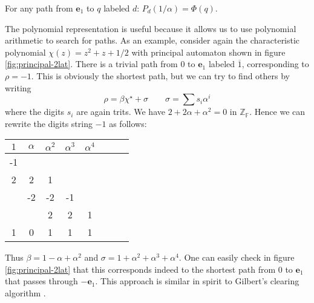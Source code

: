 \documentclass[12pt]{svmult}
\def\FF{\mathbb{F}}
\def\II{\Z_{\FF}}
\def\Z{\mathbb{Z}}
\def\chis{\Star{\chi}}          %
\def\ppol#1#2{P^{#1}_{#2}}      %
\def\trtm{\overline{1}}
\def\unvo{\mathbf{e}_{1}}
\providecommand{\Star}[1]{{#1}^{\star}}
\begin{document}
\begin{lemma}
\label{lem:path-poly-label}
For any path from $\unvo$ to $q$ labeled $d$: $\ppol{}{d}(1/\alpha) = \Phi(q)$.
\end{lemma}

The polynomial representation is useful because it allows us to use polynomial 
arithmetic to search for paths. 
As an example, consider again the characteristic polynomial $\chi(z) = z^{2} + z + 1/2$ 
with principal automaton shown in figure \ref{fig:principal-2lat}.
There is a trivial path from $0$ to $\unvo$ labeled $\trtm$, corresponding to $\rho = -1$. 
This is obviously the shortest path, but we can try to find others by writing 
%
\begin{equation}
\label{eq:clearing}
    \rho = \beta \chis + \sigma  \qquad  \sigma = \sum s_{i} \alpha^{i} 
\end{equation}
%
where the digits $s_i$ are again trits.  
We have $2 + 2 \alpha + \alpha^{2} = 0$ in $\II$. 
Hence we can rewrite the digits string $-1$ as follows: 

\hspace*{10mm}
\begin{tabular*}{0.38\linewidth}[h]{cccccccc}
  \hspace{1mm} $1$ \hspace{1mm}  & \hspace{1mm} $\alpha$ \hspace{1mm}  & \hspace{1mm} $\alpha^2$  \hspace{1mm} %
               &  \hspace{1mm} $\alpha^3$  \hspace{1mm} &  \hspace{1mm} $\alpha^4$   \\
\hline 
  -1 \\
  2  &  2  &  1 \\
     &  -2  &  -2  &  -1 \\
     &       &  2  &  2  &  1 \\
\hline
   1 &  0  &   1  &  1  &  1
\end{tabular*}

Thus $\beta = 1  - \alpha  + \alpha^{2}$ and $\sigma =  1  + \alpha^{2} + \alpha^{3} + \alpha^{4}$. 
One can easily check in figure \ref{fig:principal-2lat} that this corresponds indeed to the 
shortest path from $0$ to $\unvo$ that passes through $-\unvo$. 
This approach is similar in spirit to Gilbert's clearing algorithm 
\cite{Gilbert81:radix_represantions}.
\end{document}
